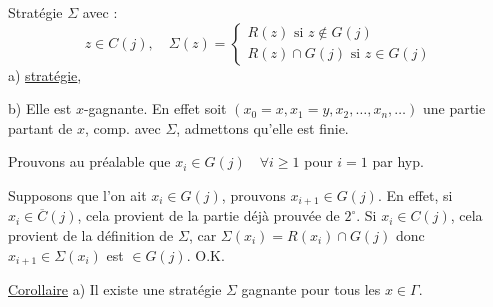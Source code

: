 Stratégie $\Sigma$ avec :
\[
z\in C(j),\quad\Sigma(z)=\begin{cases}R(z)\text{ si }z\notin G(j)\\ R(z)\cap G(j)\text{ si }z\in G(j)\end{cases}
\]
 a) \uline{ stratégie}, 


 b) Elle est $x$-gagnante. En effet soit $(x_0=x,x_1=y,x_2,\ldots,x_n,\ldots)$ une partie partant de $x$, comp. avec $\Sigma$, admettons qu'elle est finie.

Prouvons au préalable  que $x_i\in G(j)\quad\forall i\geq1$   pour $i=1$ par hyp.

Supposons que  l'on ait $x_i\in G(j)$, prouvons $x_{i+1}\in G(j)$. En effet, si $x_i\in\overline C(j)$, cela provient de la partie déjà prouvée de $2^\circ$.
Si $x_i\in C(j)$, cela provient de la définition de $\Sigma$, car $\Sigma(x_i)=R(x_i)\cap G(j)$ donc $x_{i+1}\in\Sigma(x_i)$  est $\in G(j)$. O.K.

\uline{Corollaire} 
a) Il existe une  stratégie $\Sigma$ gagnante pour tous les $x\in\Gamma$.

